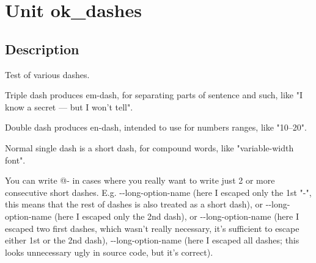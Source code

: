 \documentclass{report}
\begin{document}
\label{toc}\tableofcontents
\newpage
\newlength{\tmplength}
\chapter{Unit ok{\_}dashes}
\label{ok_dashes}
\section{Description}
Test of various dashes.\hfill\vspace*{1ex}



Triple dash produces em{-}dash, for separating parts of sentence and such, like "I know a secret --- but I won't tell".

Double dash produces en{-}dash, intended to use for numbers ranges, like "10--20".

Normal single dash is a short dash, for compound words, like "variable{-}width font".

You can write @{-} in cases where you really want to write just 2 or more consecutive short dashes. E.g. {-}{-}long{-}option{-}name (here I escaped only the 1st "{-}", this means that the rest of dashes is also treated as a short dash), or {-}{-}long{-}option{-}name (here I escaped only the 2nd dash), or {-}{-}long{-}option{-}name (here I escaped two first dashes, which wasn't really necessary, it's sufficient to escape either 1st or the 2nd dash), {-}{-}long{-}option{-}name (here I escaped all dashes; this looks unnecessary ugly in source code, but it's correct).
\end{document}
